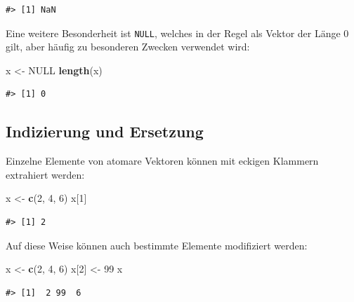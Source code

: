 \documentclass[]{tufte-book}
\newenvironment{Shaded}{}{}
\newcommand{\KeywordTok}[1]{\textcolor[rgb]{0.00,0.44,0.13}{\textbf{#1}}}
\newcommand{\DecValTok}[1]{\textcolor[rgb]{0.25,0.63,0.44}{#1}}
\newcommand{\StringTok}[1]{\textcolor[rgb]{0.25,0.44,0.63}{#1}}
\newcommand{\OtherTok}[1]{\textcolor[rgb]{0.00,0.44,0.13}{#1}}
\newcommand{\NormalTok}[1]{#1}
\begin{document}
\begin{verbatim}
#> [1] NaN
\end{verbatim}

Eine weitere Besonderheit ist \texttt{NULL}, welches in der Regel als
Vektor der Länge 0 gilt, aber häufig zu besonderen Zwecken verwendet
wird:

\begin{Shaded}
\begin{Highlighting}[]
\NormalTok{x <-}\StringTok{ }\OtherTok{NULL}
\KeywordTok{length}\NormalTok{(x)}
\end{Highlighting}
\end{Shaded}

\begin{verbatim}
#> [1] 0
\end{verbatim}

\subsection{Indizierung und Ersetzung}\label{indizierung-und-ersetzung}

Einzelne Elemente von atomare Vektoren können mit eckigen Klammern
extrahiert werden:

\begin{Shaded}
\begin{Highlighting}[]
\NormalTok{x <-}\StringTok{ }\KeywordTok{c}\NormalTok{(}\DecValTok{2}\NormalTok{, }\DecValTok{4}\NormalTok{, }\DecValTok{6}\NormalTok{)}
\NormalTok{x[}\DecValTok{1}\NormalTok{]}
\end{Highlighting}
\end{Shaded}

\begin{verbatim}
#> [1] 2
\end{verbatim}

Auf diese Weise können auch bestimmte Elemente modifiziert werden:

\begin{Shaded}
\begin{Highlighting}[]
\NormalTok{x <-}\StringTok{ }\KeywordTok{c}\NormalTok{(}\DecValTok{2}\NormalTok{, }\DecValTok{4}\NormalTok{, }\DecValTok{6}\NormalTok{)}
\NormalTok{x[}\DecValTok{2}\NormalTok{] <-}\StringTok{ }\DecValTok{99}
\NormalTok{x}
\end{Highlighting}
\end{Shaded}

\begin{verbatim}
#> [1]  2 99  6
\end{verbatim}
\end{document}
